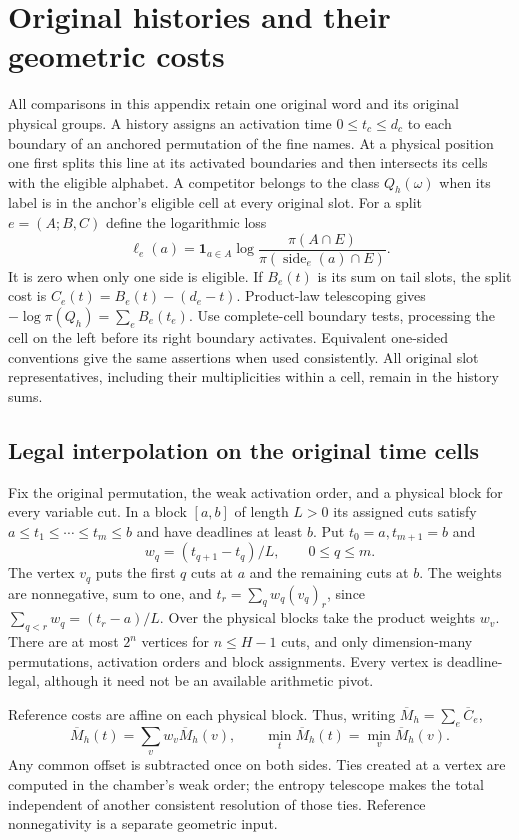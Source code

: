 \section{Original histories and their geometric costs}\label{app:history-details}

All comparisons in this appendix retain one original word and its
original physical groups. A history assigns an activation time
$0\le t_c\le d_c$ to each boundary of an anchored permutation of the
fine names. At a physical position one first splits this line at its
activated boundaries and then intersects its cells with the eligible
alphabet. A competitor belongs to the class $Q_h(\omega)$ when its
label is in the anchor's eligible cell at every original slot.
For a split $e=(A;B,C)$ define the logarithmic loss
\[
 \ell_e(a)=\mathbf1_{a\in A}
   \log\frac{\pi(A\cap E)}{\pi(\operatorname{side}_e(a)\cap E)}.
\]
It is zero when only one side is eligible. If $B_e(t)$ is its sum on
tail slots, the split cost is $C_e(t)=B_e(t)-(d_e-t)$. Product-law
telescoping gives $-\log\pi(Q_h)=\sum_eB_e(t_e)$.
Use complete-cell boundary tests, processing the cell on the left
before its right boundary activates. Equivalent one-sided conventions
give the same assertions when used consistently. All original slot
representatives, including their multiplicities within a cell, remain
in the history sums.

\subsection{Legal interpolation on the original time cells}

Fix the original permutation, the weak activation order, and a physical
block for every variable cut. In a block $[a,b]$ of length $L>0$ its
assigned cuts satisfy $a\le t_1\le\cdots\le t_m\le b$ and have
deadlines at least $b$. Put $t_0=a,t_{m+1}=b$ and
\[
 w_q=(t_{q+1}-t_q)/L,\qquad0\le q\le m.
\]
The vertex $v_q$ puts the first $q$ cuts at $a$ and the remaining cuts
at $b$. The weights are nonnegative, sum to one, and
$t_r=\sum_qw_q(v_q)_r$, since
$\sum_{q<r}w_q=(t_r-a)/L$. Over the physical blocks take the product
weights $w_v$. There are at most $2^n$ vertices for $n\le H-1$ cuts,
and only dimension-many permutations, activation orders and block
assignments. Every vertex is deadline-legal, although it need not be
an available arithmetic pivot.

Reference costs are affine on each physical block. Thus, writing
$\overline M_h=\sum_e\overline C_e$,
\begin{equation}
 \overline M_h(t)=\sum_vw_v\overline M_h(v),\qquad
 \min_t\overline M_h(t)=\min_v\overline M_h(v).
 \label{history:reference-interpolation}
\end{equation}
Any common offset is subtracted once on both sides. Ties created at a
vertex are computed in the chamber's weak order; the entropy telescope
makes the total independent of another consistent resolution of those
ties. Reference nonnegativity is a separate geometric input.

